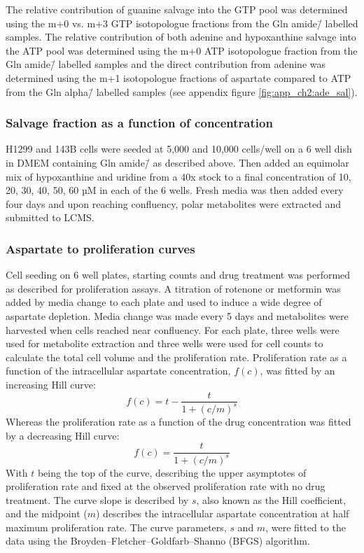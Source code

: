 The relative contribution of guanine salvage into the GTP pool was determined using the m+0 vs. m+3 GTP isotopologue fractions from the Gln amide\=/\hNi{} labelled samples.
The relative contribution of both adenine and hypoxanthine salvage into the ATP pool was determined using the m+0 ATP isotopologue fraction from the Gln amide\=/\hNi{} labelled samples and the direct contribution from adenine was determined using the m+1 isotopologue fractions of aspartate compared to ATP from the Gln alpha\=/\hNi{} labelled samples (see appendix figure \ref{fig:app_ch2:ade_sal}).


\subsubsection{Salvage fraction as a function of concentration}
H1299 and 143B cells were seeded at 5,000 and 10,000 cells/well on a 6 well dish in DMEM containing Gln amide\=/\hNi{} as described above.
Then added an equimolar mix of hypoxanthine and uridine from a 40x stock to a final concentration of 10, 20, 30, 40, 50, 60 µM in each of the 6 wells.
Fresh media was then added every four days and upon reaching confluency, polar metabolites were extracted and submitted to LCMS.


\subsubsection{Aspartate to proliferation curves}
Cell seeding on 6 well plates, starting counts and drug treatment was performed as described for proliferation assays.
A titration of rotenone or metformin was added by media change to each plate and used to induce a wide degree of aspartate depletion.
Media change was made every 5 days and metabolites were harvested when cells reached near confluency.
For each plate, three wells were used for metabolite extraction and three wells were used for cell counts to calculate the total cell volume and the proliferation rate.
Proliferation rate as a function of the intracellular aspartate concentration, $f(c)$, was fitted by an increasing Hill curve:
$$
f(c) = t - \frac{t}{1 + (c/m)^s}
$$
Whereas the proliferation rate as a function of the drug concentration was fitted by a decreasing Hill curve:
$$
f(c) = \frac{t}{1 + (c/m)^s}
$$
With $t$ being the top of the curve, describing the upper asymptotes of proliferation rate and fixed at the observed proliferation rate with no drug treatment.
The curve slope is described by $s$, also known as the Hill coefficient, and the midpoint ($m$) describes the intracellular aspartate concentration at half maximum proliferation rate.
The curve parameters, $s$ and $m$, were fitted to the data using the Broyden–Fletcher–Goldfarb–Shanno (BFGS) algorithm.


